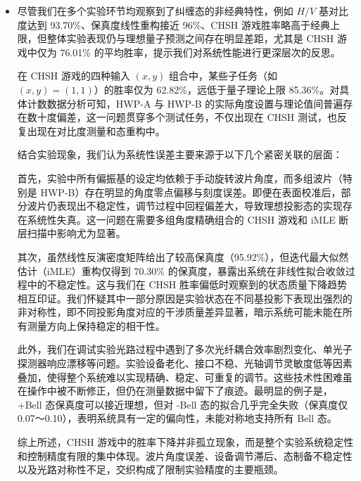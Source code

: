 \begin{itemize}
	以 $(x,y) = (1,1)$ 为例，其四个输出 $(a,b)$ 对应计数如下：$(a,b)=(0,0)$：HH = 470 → 这是“失败”输出；其余为“成功”输出（HV, VH, VV）总计 = 1080 + 880 + 690 = 2650。
	
	胜率计算：
	\[
	P_{\text{win}}^{(x=1,y=1)} = \frac{2650}{3120} = 0.8487 \quad (\text{理应为失败，结果接近理论胜率})
	\]
	但此处反而HH 被认为是成功输出（$a \oplus b = 1$），说明实验记录中可能存在输出标记顺序或判断逻辑与理论定义不一致之处，需要进一步核对编码与测量对应关系。
	
	从整体上看，每组输入 $(x,y)$ 的符合计数在“赢”与“输”之间的比例，与其对应测量基之间的重叠度成正相关，而这又依赖于波片角度设定的准确性。
	
	\item 尽管我们在多个实验环节均观察到了纠缠态的非经典特性，例如 $H/V$ 基对比度达到 93.70\%、保真度线性重构接近 96\%、CHSH 游戏胜率略高于经典上限，但整体实验表现仍与理想量子预测之间存在明显差距，尤其是 CHSH 游戏中仅为 76.01\% 的平均胜率，提示我们对系统性能进行更深层次的反思。
	
	在 CHSH 游戏的四种输入 $(x, y)$ 组合中，某些子任务（如 $(x, y) = (1, 1)$）的胜率仅为 62.82\%，远低于量子理论上限 85.36\%。对具体计数数据分析可知，HWP-A 与 HWP-B 的实际角度设置与理论值间普遍存在数十度偏差，这一问题贯穿多个测试任务，不仅出现在 CHSH 测试，也反复出现在对比度测量和态重构中。
	
	结合实验现象，我们认为系统性误差主要来源于以下几个紧密关联的层面：
	
	首先，实验中所有偏振基的设定均依赖于手动旋转波片角度，而多组波片（特别是 HWP-B）存在明显的角度零点偏移与刻度误差。即便在表面校准后，部分波片仍表现出不稳定性，调节过程中回程偏差大，导致理想投影态的实现存在系统性失真。这一问题在需要多组角度精确组合的 CHSH 游戏和 iMLE 断层扫描中影响尤为显著。
	
	其次，虽然线性反演密度矩阵给出了较高保真度（95.92\%），但迭代最大似然估计（iMLE）重构仅得到 70.30\% 的保真度，暴露出系统在非线性拟合收敛过程中的不稳定性。这与我们在 CHSH 胜率偏低时观察到的状态质量下降趋势相互印证。我们怀疑其中一部分原因是实验状态在不同基投影下表现出强烈的非对称性，即不同投影角度对应的干涉质量差异显著，暗示系统可能未能在所有测量方向上保持稳定的相干性。
	
	此外，我们在调试实验光路过程中遇到了多次光纤耦合效率剧烈变化、单光子探测器响应漂移等问题。实验设备老化、接口不稳、光轴调节灵敏度低等因素叠加，使得整个系统难以实现精确、稳定、可重复的调节。这些技术性困难虽在操作中被不断修正，但仍在测量数据中留下了痕迹。最明显的例子是，+Bell 态保真度可以接近理想，但对 -Bell 态的拟合几乎完全失败（保真度仅 0.07～0.10），表明系统具有一定的偏向性，未能对称地支持所有 Bell 态。
	
	综上所述，CHSH 游戏中的胜率下降并非孤立现象，而是整个实验系统稳定性和控制精度有限的集中体现。波片角度误差、设备调节滞后、态制备不稳定性以及光路对称性不足，交织构成了限制实验精度的主要瓶颈。
\end{itemize}

